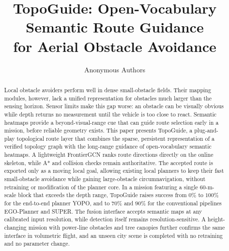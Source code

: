 \documentclass[letterpaper,10pt,conference]{ieeeconf}
\title{\LARGE \bf
TopoGuide: Open-Vocabulary Semantic Route Guidance\\
for Aerial Obstacle Avoidance
}
\author{Anonymous Authors}
\begin{document}
\maketitle
\thispagestyle{empty}
\pagestyle{empty}

\begin{abstract}
Local obstacle avoiders perform well in dense small-obstacle fields.
Their mapping modules, however, lack a unified representation for
obstacles much larger than the sensing horizon.  Sensor limits make
this gap worse: an obstacle can be visually obvious while depth
returns no measurement until the vehicle is too close to react.
Semantic heatmaps provide a beyond-visual-range cue that can guide
route selection early in a mission, before reliable geometry exists.
This paper presents TopoGuide, a plug-and-play topological route
layer that combines the sparse, persistent representation of a
verified topology graph with the long-range guidance of
open-vocabulary semantic heatmaps.  A lightweight FrontierGCN ranks
route directions directly on the online skeleton, while A* and
collision checks remain authoritative.  The accepted route is
exported only as a moving local goal, allowing existing
local planners to keep their fast small-obstacle avoidance while
gaining large-obstacle circumnavigation, without retraining or
modification of the planner core.  In a
mission featuring a single 60-m-scale block that exceeds the depth
range, TopoGuide raises success from $0\%$ to $100\%$ for the
end-to-end planner YOPO, and to $70\%$ and $90\%$ for the
conventional pipelines EGO-Planner and SUPER.
The fusion interface accepts semantic maps at any calibrated
input resolution, while detection itself remains
resolution-sensitive.  A height-changing
mission with power-line obstacles and tree canopies further confirms
the same interface in volumetric flight, and an unseen city scene is
completed with no retraining and no parameter change.
\end{abstract}

\end{document}
